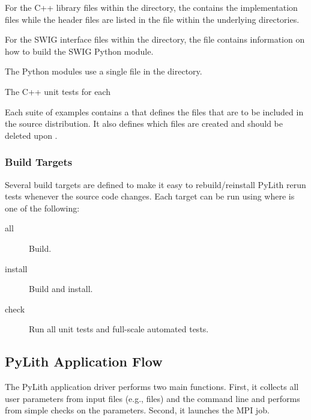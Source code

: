 For the C++ library files within the  directory, the
 contains the implementation files while
the header files are listed in the  file within
the underlying directories.

For the SWIG interface files within the 
directory, the  file contains information on how
to build the SWIG Python module.

The Python modules use a single  file in
the  directory.

The C++ unit tests for each 

Each suite of examples contains a  that defines
the files that are to be included in the source distribution. It also
defines which files are created and should be deleted upon
.

\subsubsection{Build Targets}

Several build targets are defined to make it easy to rebuild/reinstall
PyLith rerun tests whenever the source code changes. Each target can
be run using  where  is
one of the following:

\begin{description}
\item[all] Build.
\item[install] Build and install.
\item[check] Run all unit tests and full-scale automated tests.
\end{description}


\subsection{PyLith Application Flow}

The PyLith application driver performs two main functions. First, it
collects all user parameters from input files (e.g., 
files) and the command line and performs from simple checks on the
parameters. Second, it launches the MPI job.

